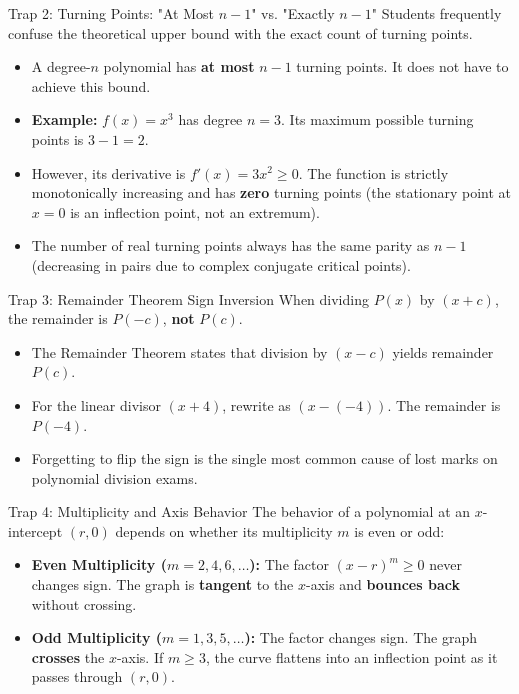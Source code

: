 \begin{trapbox}{Trap 2: Turning Points: "At Most $n-1$" vs. "Exactly $n-1$"}
Students frequently confuse the theoretical upper bound with the exact count of turning points.
\begin{itemize}
    \item A degree-$n$ polynomial has \textbf{at most} $n - 1$ turning points. It does not have to achieve this bound.
    \item \textbf{Example:} $f(x) = x^3$ has degree $n = 3$. Its maximum possible turning points is $3 - 1 = 2$.
    \item However, its derivative is $f'(x) = 3x^2 \ge 0$. The function is strictly monotonically increasing and has \textbf{zero} turning points (the stationary point at $x = 0$ is an inflection point, not an extremum).
    \item The number of real turning points always has the same parity as $n - 1$ (decreasing in pairs due to complex conjugate critical points).
\end{itemize}
\end{trapbox}

\begin{trapbox}{Trap 3: Remainder Theorem Sign Inversion}
When dividing $P(x)$ by $(x + c)$, the remainder is $P(-c)$, \textbf{not} $P(c)$.
\begin{itemize}
    \item The Remainder Theorem states that division by $(x - c)$ yields remainder $P(c)$.
    \item For the linear divisor $(x + 4)$, rewrite as $(x - (-4))$. The remainder is $P(-4)$.
    \item Forgetting to flip the sign is the single most common cause of lost marks on polynomial division exams.
\end{itemize}
\end{trapbox}

\begin{trapbox}{Trap 4: Multiplicity and Axis Behavior}
The behavior of a polynomial at an $x$-intercept $(r, 0)$ depends on whether its multiplicity $m$ is even or odd:
\begin{itemize}
    \item \textbf{Even Multiplicity ($m = 2, 4, 6, \dots$):} The factor $(x - r)^m \ge 0$ never changes sign. The graph is \textbf{tangent} to the $x$-axis and \textbf{bounces back} without crossing.
    \item \textbf{Odd Multiplicity ($m = 1, 3, 5, \dots$):} The factor changes sign. The graph \textbf{crosses} the $x$-axis. If $m \ge 3$, the curve flattens into an inflection point as it passes through $(r, 0)$.
\end{itemize}
\end{trapbox}

